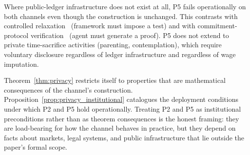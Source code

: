 \begin{proposition}
\begin{enumerate}
  Where public-ledger infrastructure does not exist at all, P5
  fails operationally on both channels even though the
  construction is unchanged.  This contrasts with controlled
  relaxation~\citep[Controlled~Relaxation]{lasser2026wamura} (framework must impose a
  test) and with commitment-protocol
  verification~\citep[Exogenous~Verification]{lasser2026exo} (agent must generate a
  proof).  P5 does not extend to private time-sacrifice
  activities (parenting, contemplation), which require voluntary
  disclosure regardless of ledger infrastructure and regardless
  of wage imputation.
\end{enumerate}
\end{proposition}

\begin{remark}
\label{rem:privacy_mixed_status}
Theorem~\ref{thm:privacy} restricts itself to properties that are
mathematical consequences of the channel's construction.
Proposition~\ref{prop:privacy_institutional} catalogues the
deployment conditions under which P2 and P5 hold operationally.
Treating P2 and P5 as institutional preconditions rather than as
theorem consequences is the honest framing: they are load-bearing
for how the channel behaves in practice, but they depend on facts
about markets, legal systems, and public infrastructure that lie
outside the paper's formal scope.
\end{remark}
